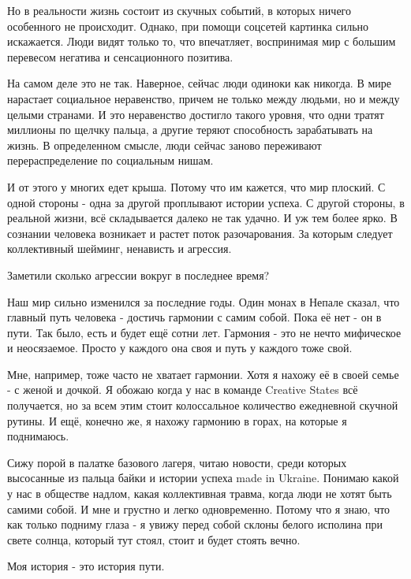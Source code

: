 Но в реальности жизнь состоит из скучных событий, в которых ничего особенного
не происходит. Однако, при помощи соцсетей картинка сильно искажается. Люди
видят только то, что впечатляет, воспринимая мир с большим перевесом негатива и
сенсационного позитива. 

На самом деле это не так. Наверное, сейчас люди одиноки как никогда. В мире
нарастает социальное неравенство, причем не только между людьми, но и между
целыми странами. И это неравенство достигло такого уровня, что одни тратят
миллионы по щелчку пальца, а другие теряют способность зарабатывать на жизнь. В
определенном смысле, люди сейчас заново переживают перераспределение по
социальным нишам. 

И от этого у многих едет крыша. Потому что им кажется, что мир плоский. С одной
стороны - одна за другой проплывают истории успеха. С другой стороны, в
реальной жизни, всё складывается далеко не так удачно. И уж тем более ярко. В
сознании человека возникает и растет поток разочарования. За которым следует
коллективный шейминг, ненависть и агрессия. 

Заметили сколько агрессии вокруг в последнее время? 

Наш мир сильно изменился за последние годы. Один монах в Непале сказал, что
главный путь человека - достичь гармонии с самим собой. Пока её нет - он в
пути. Так было, есть и будет ещё сотни лет. Гармония - это не нечто мифическое
и неосязаемое. Просто у каждого она своя и путь у каждого тоже свой. 

Мне, например, тоже часто не хватает гармонии. Хотя я нахожу её в своей семье -
с женой и дочкой. Я обожаю когда у нас в команде Creative States всё
получается, но за всем этим стоит колоссальное количество ежедневной скучной
рутины. И ещё, конечно же, я нахожу гармонию в горах, на которые я поднимаюсь. 

Сижу порой в палатке базового лагеря, читаю новости, среди которых высосанные
из пальца байки и истории успеха made in Ukraine. Понимаю какой у нас в
обществе надлом, какая коллективная травма, когда люди не хотят быть самими
собой. И мне и грустно и легко одновременно. Потому что я знаю, что как только
подниму глаза - я увижу перед собой склоны белого исполина при свете солнца,
который тут стоял, стоит и будет стоять вечно. 

Моя история - это история пути.

